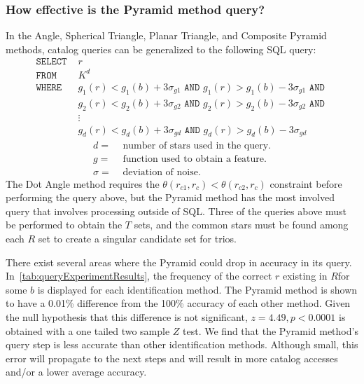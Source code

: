 \subsubsection{How effective is the Pyramid method query?}
In the Angle, Spherical Triangle, Planar Triangle, and Composite Pyramid methods, catalog queries can be
generalized to the following SQL query:
\begin{align*}
    \texttt{SELECT } &r \\
    \texttt{FROM } &K^d \\
    \texttt{WHERE } &g_1(r) < g_1(b) + 3\sigma_{g1} \texttt{ AND } g_1(r) > g_1(b) - 3\sigma_{g1} \texttt{ AND } \\
    &g_2(r) < g_2(b) + 3\sigma_{g2} \texttt{ AND } g_2(r) > g_2(b) - 3\sigma_{g2} \texttt{ AND } \\
    &\vdots \\
    &g_d(r) < g_d(b) + 3\sigma_{gd} \texttt{ AND } g_d(r) > g_d(b) - 3\sigma_{gd}
\end{align*}
\begin{align*}
    d =& \text{ number of stars used in the query.} \\
    g =& \text{ function used to obtain a feature. } \\
    \sigma =& \text{ deviation of noise. }
\end{align*}
The Dot Angle method requires the $\theta(r_{c1}, r_{c}) < \theta(r_{c2}, r_c)$ constraint before performing the query
above, but the Pyramid method has the most involved query that involves processing outside of SQL\@.
Three of the queries above must be performed to obtain the $T$ sets, and the common stars must be
found among each $R$ set to create a singular candidate set for trios.

There exist several areas where the Pyramid could drop in accuracy in its query.
In~\autoref{tab:queryExperimentResults}, the frequency of the correct $r$ existing in $R$for some $b$ is displayed
for each identification method.
The Pyramid method is shown to have a 0.01\% difference from the 100\% accuracy of each other method.
Given the null hypothesis that this difference is not significant, $z= 4.49, p < 0.0001$ is obtained with a one tailed
two sample $Z$ test.
We find that the Pyramid method's query step is less accurate than other identification methods.
Although small, this error will propagate to the next steps and will result in more catalog accesses and/or a lower
average accuracy.

